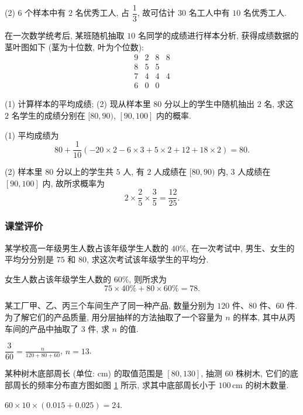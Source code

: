     (2) $6$ 个样本中有 $2$ 名优秀工人, 占 $\dfrac13$, 故可估计 $30$ 名工人中有 $10$ 名优秀工人.
\endsolution

\lianxi
\begin{exercise}[s]
    在一次数学统考后, 某班随机抽取 $10$ 名同学的成绩进行样本分析, 获得成绩数据的茎叶图如下 (茎为十位数, 叶为个位数):
    \[\begin{array}{c|ccc}
      9 & 2 & 8 & 8\\
      8 & 5 & 5 &  \\
      7 & 4 & 4 & 4\\
      6 & 0 & 0 &
    \end{array}\]
    
    (1) 计算样本的平均成绩;\qquad
    (2) 现从样本里 $80$ 分以上的学生中随机抽出 $2$ 名, 求这 $2$ 名学生的成绩分别在 $[80, 90)$, $[90, 100]$ 内的概率.
\end{exercise}
\beginsolution
    (1) 平均成绩为
    \[80+ \frac{1}{10}(-20\times 2- 6\times 3
    + 5\times 2+ 12+ 18\times 2)= 80.\]

    (2) 样本里 $80$ 分以上的学生共 $5$ 人, 有 $2$ 人成绩在 $[80,90)$ 内, $3$ 人成绩在 $[90,100]$ 内, 故所求概率为
    \[2\times \frac25\times \frac35= \frac{12}{25}.\]
\endsolution

\subsubsection{课堂评价}
\begin{exercise}
    某学校高一年级男生人数占该年级学生人数的 $40\%$, 在一次考试中, 男生、女生的平均分分别是 $75$ 和 $80$, 求这次考试该年级学生的平均分.
\end{exercise}
\beginsolution
    女生人数占该年级学生人数的 $60\%$, 则所求为
    \[75\times 40\%+ 80\times 60\%= 78.\]
\endsolution

\begin{exercise}
    某工厂甲、乙、丙三个车间生产了同一种产品, 数量分别为 $120$ 件、$80$ 件、$60$ 件. 为了解它们的产品质量, 用分层抽样的方法抽取了一个容量为 $n$ 的样本, 其中从丙车间的产品中抽取了 $3$ 件, 求 $n$ 的值.
\end{exercise}
\beginsolution
    $\dfrac{3}{60}= \frac{n}{120+80+60}$, $n=13$.
\endsolution

\begin{exercise}
    某种树木底部周长 (单位: $\text{cm}$) 的取值范围是 $[80, 130]$, 抽测 $60$ 株树木, 它们的底部周长的频率分布直方图如图 \ref{fig-190629-1710} 所示, 求其中底部周长小于 $100\,\text{cm}$ 的树木数量.
    \begin{figure}[htb]
        \small\centering
       \caption{}\label{fig-190629-1710}
    \end{figure}
\end{exercise}
\beginsolution
    $60\times 10\times (0.015+0.025)= 24$.
\endsolution
    
